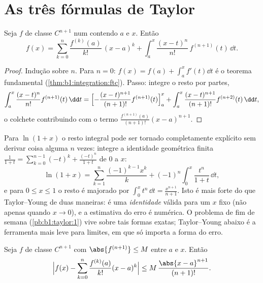 \section{As três fórmulas de Taylor}

\begin{theorem}\label{thm:b1:taylor:integral}
Seja $f$ de classe $C^{n+1}$ num  contendo $a$ e $x$.
Então
\[
f(x) = \sum_{k=0}^{n} \frac{f^{(k)}(a)}{k!}\,(x - a)^k
+ \int_a^x \frac{(x - t)^n}{n!}\, f^{(n+1)}(t)\, \dd t .
\]
\end{theorem}

\begin{proof}
Indução sobre $n$. Para $n = 0$: $f(x) = f(a) + \int_a^x f'(t)\dd t$ é
o teorema fundamental (\cref{thm:b1:integration:ftc}). Passo:
integre o resto por partes,
\[
\int_a^x \frac{(x-t)^n}{n!} f^{(n+1)}(t)\,\dd t
= \Bigl[-\frac{(x-t)^{n+1}}{(n+1)!} f^{(n+1)}(t)\Bigr]_a^x
+ \int_a^x \frac{(x-t)^{n+1}}{(n+1)!} f^{(n+2)}(t)\,\dd t ,
\]
o colchete contribuindo com o termo $\frac{f^{(n+1)}(a)}{(n+1)!}(x -
a)^{n+1}$.
\end{proof}

\begin{example}\label{ex:b1:taylor:lnexact}
Para $\ln(1 + x)$ o resto integral pode ser tornado completamente
explícito sem derivar coisa alguma $n$ vezes: integre a identidade
geométrica finita $\frac{1}{1+t} =
\sum_{k=0}^{n-1}(-t)^k + \frac{(-t)^n}{1+t}$ de $0$ a $x$:
\[
\ln(1 + x) = \sum_{k=1}^{n} \frac{(-1)^{k-1}x^k}{k}
+ (-1)^n \int_0^x \frac{t^n}{1 + t}\,\dd t ,
\]
e para $0 \leq x \leq 1$ o resto é majorado por $\int_0^x
t^n\,\dd t = \frac{x^{n+1}}{n+1}$. Isto é mais forte do que
Taylor--Young de duas maneiras: é uma \emph{identidade} válida para um
$x$ fixo (não apenas quando $x \to 0$), e a estimativa do erro é
numérica. O problema de fim de semana (\cref{pb:b1:taylor:1}) vive sobre tais formas
exatas; Taylor--Young abaixo é a ferramenta mais leve para limites, em
que só importa a forma do erro.
\end{example}

\begin{theorem}\label{thm:b1:taylor:lagrange}
Seja $f$ de classe $C^{n+1}$ com $\abs{f^{(n+1)}} \leq M$ entre $a$ e
$x$. Então
\[
\Bigl| f(x) - \sum_{k=0}^{n} \frac{f^{(k)}(a)}{k!}(x-a)^k \Bigr|
\leq M\, \frac{\abs{x - a}^{n+1}}{(n+1)!} .
\]
\end{theorem}

